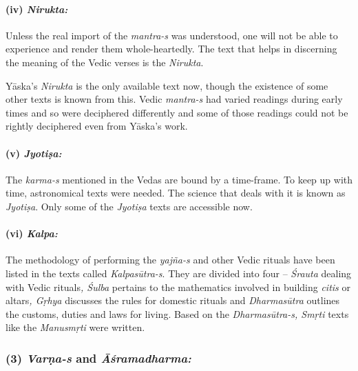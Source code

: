 \paragraph*{(iv) \textit{Nirukta:}}

\vskip -8pt

Unless the real import of the \textit{mantra-s} was understood, one will not be able to experience and render them whole-heartedly. The text that helps in discerning the meaning of the Vedic verses is the \textit{Nirukta}.

Yāska’s \textit{Nirukta} is the only available text now, though the existence of some other texts is known from this. Vedic \textit{mantra-s} had varied readings during early times and so were deciphered differently and some of those readings could not be rightly deciphered even from Yāska’s work.


\paragraph*{(v) \textit{Jyotiṣa:}}

\vskip -7.3pt

The \textit{karma-s} mentioned in the Vedas are bound by a time-frame. To keep up with time, astronomical texts were needed. The science that deals with it is known as \textit{Jyotiṣa}. Only some of the \textit{Jyotiṣa} texts are accessible now.


\paragraph*{(vi) \textit{Kalpa:}}

\vskip -7.3pt

The methodology of performing the \textit{yajña-s} and other Vedic rituals have been listed in the texts called \textit{Kalpasūtra-s}. They are divided into four – \textit{Śrauta} dealing with Vedic rituals\textit{, Śulba} pertains to the mathematics involved in building \textit{citis} or altars\textit{, Gṛhya} discusses the rules for domestic rituals and \textit{Dharmasūtra} outlines the customs, duties and laws for living. Based on the \textit{Dharmasūtra-s, Smṛti} texts like the \textit{Manusmṛti} were written.


\subsubsection*{(3) \textit{Varṇa-s} and \textit{Āśramadharma:}}


